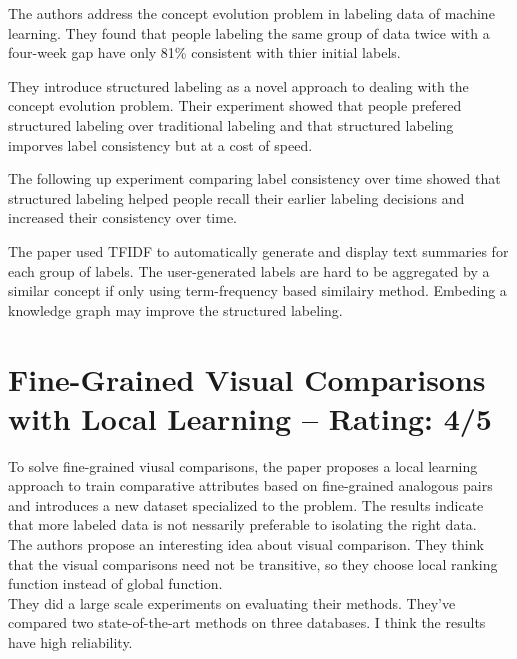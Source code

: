\documentclass[a4paper]{article}
\begin{document}
The authors address the concept evolution problem in labeling data of machine learning. They found that people labeling the same group of data twice with a four-week gap have only 81\% consistent with thier initial labels.

They introduce structured labeling as a novel approach to dealing with the concept evolution problem. Their experiment showed that people prefered structured labeling over traditional labeling and that structured labeling imporves label consistency but at a cost of speed.

The following up experiment comparing label consistency over time showed that structured labeling helped people recall their earlier labeling decisions and increased their consistency over time.

The paper used TFIDF to automatically generate and display text summaries for each group of labels. The user-generated labels are hard to be aggregated by a similar concept if only using term-frequency based similairy method. Embeding a knowledge graph may improve the structured labeling.

\section{Fine-Grained Visual Comparisons with Local Learning -- Rating: 4/5}
To solve fine-grained viusal comparisons, the paper \cite{fine-grained} proposes a local learning approach to train comparative attributes based on fine-grained analogous pairs and introduces a new dataset specialized to the problem. The results indicate that more labeled data is not nessarily preferable to isolating the right data. \\

The authors propose an interesting idea about visual comparison. They think that the visual comparisons need not be transitive, so they choose local ranking function instead of global function. \\

They did a large scale experiments on evaluating their methods. They've compared two state-of-the-art methods on three databases. I think the results have high reliability. \\
\end{document}
